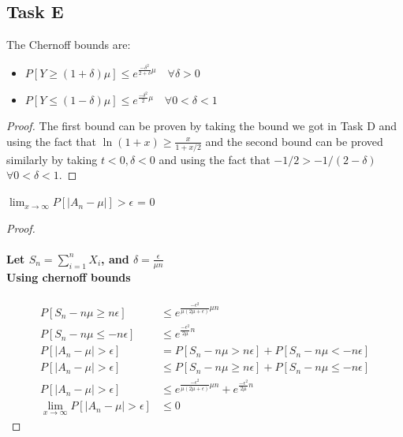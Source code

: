 \subsection*{Task E}
\begin{claim}
	The Chernoff bounds are:\\
	\begin{itemize}
		\item \(P[Y\geq (1+\delta)\mu] \leq e^{\frac{-\delta^2}{2+\delta}\mu} \hspace{1em}\forall \delta >0 \)
		\item \(P[Y\leq (1-\delta)\mu] \leq e^{\frac{-\delta^2}{2}\mu} \hspace{1em}\forall 0< \delta < 1\)
	\end{itemize}
\end{claim}
\begin{proof}
	The first bound can be proven by taking the bound we got in Task D and using the fact that \(\ln(1+x) \geq \frac{x}{1+x/2}\) and the second bound can be proved similarly by taking \(t < 0, \delta <0\) and using the fact that \(-1/2 > -1/(2-\delta)\) \(\forall 0<\delta<1\).
\end{proof}
\begin{claim}
	\(\lim_{x\to\infty} P[|A_n - \mu|] > \epsilon \) = 0
\end{claim}
\begin{proof}
	\paragraph{Let \(S_n = \sum_{i=1}^n X_i \), and \(\delta = \frac{\epsilon}{\mu n }\) \\ Using chernoff bounds}
	\begin{align*}
		P[S_n - n \mu \geq n \epsilon]            & \leq e^{\frac{-\epsilon ^2}{\mu (2\mu +\epsilon)}\mu n}                                  \\
		P[S_n - n\mu \leq - n\epsilon]            & \leq e^{\frac{-\epsilon ^2}{2\mu}n}                                                      \\
		P[|A_n-\mu| > \epsilon]                   & = P[S_n - n \mu > n \epsilon] + P[S_n - n\mu < - n\epsilon]                              \\
		P[|A_n-\mu| > \epsilon]                   & \leq P[S_n - n\mu \geq n\epsilon] + P[S_n - n\mu \leq - n\epsilon]                       \\
		P[|A_n-\mu| > \epsilon]                   & \leq e^{\frac{-\epsilon ^2}{\mu (2\mu +\epsilon)}\mu n} + e^{\frac{-\epsilon ^2}{2\mu}n} \\
		\lim_{x\to\infty} P[|A_n-\mu| > \epsilon] & \leq 0
	\end{align*}
\end{proof}

